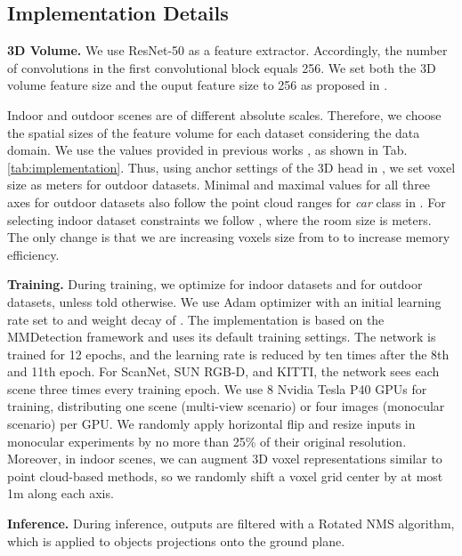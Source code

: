\documentclass[10pt,twocolumn,letterpaper]{article}
\begin{document}
\subsection{Implementation Details} \label{sec:implementation}

\textbf{3D Volume.} We use ResNet-50 \cite{he2016resnet} as a feature extractor. Accordingly, the number of convolutions in the first convolutional block  equals 256. We set both the 3D volume feature size  and the ouput feature size  to 256 as proposed in \cite{lang2019pointpillars, yan2018second}.

Indoor and outdoor scenes are of different absolute scales. Therefore, we choose the spatial sizes of the feature volume for each dataset considering the data domain. We use the values provided in previous works \cite{murez2020atlas, lang2019pointpillars, yan2018second, sindagi2019mvxnet}, as shown in Tab. \ref{tab:implementation}. Thus, using anchor settings of the 3D head in \cite{lang2019pointpillars, sindagi2019mvxnet}, we set voxel size  as  meters for outdoor datasets. Minimal and maximal values for all three axes for outdoor datasets also follow the point cloud ranges for \textit{car} class in \cite{lang2019pointpillars, sindagi2019mvxnet}. For selecting indoor dataset constraints we follow \cite{murez2020atlas}, where the room size is  meters. The only change is that we are increasing voxels size  from  to  to increase memory efficiency. 

\textbf{Training.} During training, we optimize  for indoor datasets and  for outdoor datasets, unless told otherwise. We use Adam optimizer with an initial learning rate set to  and weight decay of . The implementation is based on the MMDetection framework \cite{chen2019mmdetection} and uses its default training settings. The network is trained for 12 epochs, and the learning rate is reduced by ten times after the 8th and 11th epoch. For ScanNet, SUN RGB-D, and KITTI, the network sees each scene three times every training epoch. We use 8 Nvidia Tesla P40 GPUs for training, distributing one scene (multi-view scenario) or four images (monocular scenario) per GPU. We randomly apply horizontal flip and resize inputs in monocular experiments by no more than 25\% of their original resolution. Moreover, in indoor scenes, we can augment 3D voxel representations similar to point cloud-based methods, so we randomly shift a voxel grid center by at most 1m along each axis.

\textbf{Inference.} During inference, outputs are filtered with a Rotated NMS algorithm, which is applied to objects projections onto the ground plane.
\end{document}
